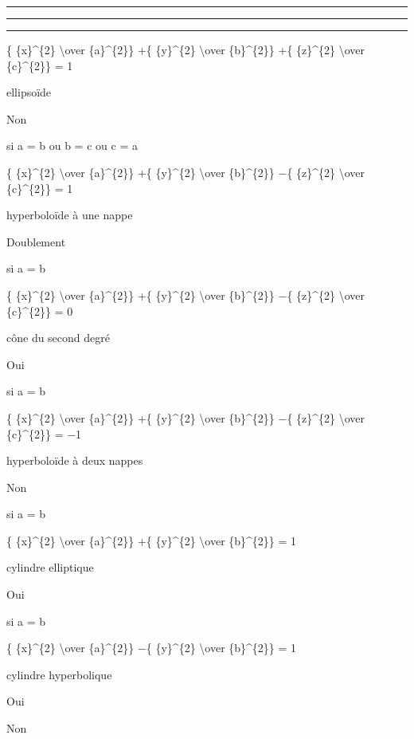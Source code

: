 \documentclass[]{article}
\begin{document}
\begin{center}\rule{3in}{0.4pt}\end{center}

\begin{center}\rule{3in}{0.4pt}\end{center}

\begin{center}\rule{3in}{0.4pt}\end{center}

\{ \{x\}\^{}\{2\} \textbackslash{}over \{a\}\^{}\{2\}\} +\{
\{y\}\^{}\{2\} \textbackslash{}over \{b\}\^{}\{2\}\} +\{ \{z\}\^{}\{2\}
\textbackslash{}over \{c\}\^{}\{2\}\} = 1

ellipsoïde

Non

si a = b ou b = c ou c = a

\{ \{x\}\^{}\{2\} \textbackslash{}over \{a\}\^{}\{2\}\} +\{
\{y\}\^{}\{2\} \textbackslash{}over \{b\}\^{}\{2\}\} −\{ \{z\}\^{}\{2\}
\textbackslash{}over \{c\}\^{}\{2\}\} = 1

hyperboloïde à une nappe

Doublement

si a = b

\{ \{x\}\^{}\{2\} \textbackslash{}over \{a\}\^{}\{2\}\} +\{
\{y\}\^{}\{2\} \textbackslash{}over \{b\}\^{}\{2\}\} −\{ \{z\}\^{}\{2\}
\textbackslash{}over \{c\}\^{}\{2\}\} = 0

cône du second degré

Oui

si a = b

\{ \{x\}\^{}\{2\} \textbackslash{}over \{a\}\^{}\{2\}\} +\{
\{y\}\^{}\{2\} \textbackslash{}over \{b\}\^{}\{2\}\} −\{ \{z\}\^{}\{2\}
\textbackslash{}over \{c\}\^{}\{2\}\} = −1

hyperboloïde à deux nappes

Non

si a = b

\{ \{x\}\^{}\{2\} \textbackslash{}over \{a\}\^{}\{2\}\} +\{
\{y\}\^{}\{2\} \textbackslash{}over \{b\}\^{}\{2\}\} = 1

cylindre elliptique

Oui

si a = b

\{ \{x\}\^{}\{2\} \textbackslash{}over \{a\}\^{}\{2\}\} −\{
\{y\}\^{}\{2\} \textbackslash{}over \{b\}\^{}\{2\}\} = 1

cylindre hyperbolique

Oui

Non
\end{document}
